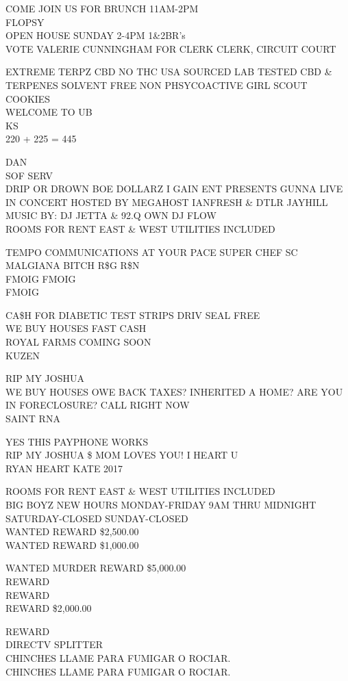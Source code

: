\documentclass[10pt,letterpaper]{article}
\begin{document}
COME JOIN US FOR BRUNCH 11AM{-}2PM\\
FLOPSY\\
OPEN HOUSE SUNDAY 2{-}4PM 1\&2BR's\\
VOTE VALERIE CUNNINGHAM FOR CLERK CLERK, CIRCUIT COURT

EXTREME TERPZ CBD NO THC USA SOURCED LAB TESTED CBD \& TERPENES SOLVENT FREE NON PHSYCOACTIVE GIRL SCOUT COOKIES\\
WELCOME TO UB\\
KS\\
220 + 225 = 445

DAN\\
SOF SERV\\
DRIP OR DROWN BOE DOLLARZ I GAIN ENT PRESENTS GUNNA LIVE IN CONCERT HOSTED BY MEGAHOST IANFRESH \& DTLR JAYHILL MUSIC BY: DJ JETTA \& 92.Q OWN DJ FLOW\\
ROOMS FOR RENT EAST \& WEST UTILITIES INCLUDED

TEMPO COMMUNICATIONS AT YOUR PACE SUPER CHEF SC\\
MALGIANA BITCH R\$G R\$N\\
FMOIG FMOIG\\
FMOIG

CA\$H FOR DIABETIC TEST STRIPS DRIV SEAL FREE\\
WE BUY HOUSES FAST CASH\\
ROYAL FARMS COMING SOON\\
KUZEN

RIP MY JOSHUA\\
WE BUY HOUSES OWE BACK TAXES?  INHERITED A HOME?  ARE YOU IN FORECLOSURE?  CALL RIGHT NOW\\
SAINT RNA

YES THIS PAYPHONE WORKS\\
RIP MY JOSHUA \$ MOM LOVES YOU!  I HEART U\\
RYAN HEART KATE 2017

ROOMS FOR RENT EAST \& WEST UTILITIES INCLUDED\\
BIG BOYZ NEW HOURS MONDAY{-}FRIDAY 9AM THRU MIDNIGHT SATURDAY{-}CLOSED SUNDAY{-}CLOSED\\
WANTED REWARD \$2,500.00\\
WANTED REWARD \$1,000.00

WANTED MURDER REWARD \$5,000.00\\
REWARD\\
REWARD\\
REWARD \$2,000.00

REWARD\\
DIRECTV SPLITTER\\
CHINCHES LLAME PARA FUMIGAR O ROCIAR.\\
CHINCHES LLAME PARA FUMIGAR O ROCIAR.
\end{document}
